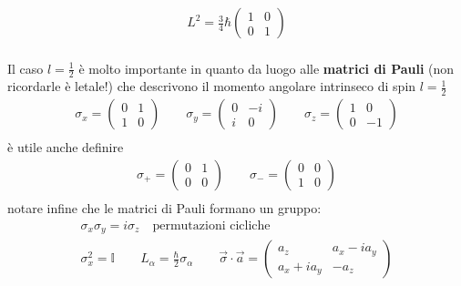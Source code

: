 \begin{itemize}
\begin{equation}
\begin{split}
L^2=\frac{3}{4}\hbar\left(\begin{matrix}1&0\\0&1\end{matrix}\right)
\end{split}\end{equation}\\
Il caso $l=\frac{1}{2}$ è molto importante in quanto da luogo alle \textbf{matrici di Pauli} (non ricordarle è letale!) che descrivono il momento angolare intrinseco di spin $l=\frac{1}{2}$ 
\begin{equation}\begin{split}
\boxed{\sigma_x=\left(\begin{matrix}0&1\\1&0\end{matrix}\right) \qquad
\sigma_y=\left(\begin{matrix}0&-i\\i&0\end{matrix}\right) \qquad
\sigma_z=\left(\begin{matrix}1&0\\0&-1\end{matrix}\right)} \\
\end{split}\end{equation}
è utile anche definire
\begin{equation}\begin{split}
\sigma_+=\left(\begin{matrix}0&1\\0&0\end{matrix}\right) \qquad
\sigma_-=\left(\begin{matrix}0&0\\1&0\end{matrix}\right) \\
\end{split}\end{equation}
notare infine che le matrici di Pauli formano un gruppo:\\
\begin{equation}\begin{split}
\sigma_x\sigma_y=i\sigma_z \quad \textrm{permutazioni cicliche} \\
\sigma_x^2=\mathbb{I} \qquad
L_\alpha=\frac{\hbar }{2}\sigma_\alpha\qquad
\vec{\sigma}\cdot\vec{a}=\left(\begin{matrix}a_z&a_x-ia_y\\a_x+ia_y&-a_z\end{matrix}\right)\\

\end{split}
\end{equation}
\end{itemize}
